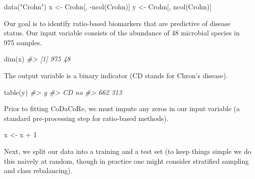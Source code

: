 \documentclass[
]{article}
\newenvironment{Shaded}{\begin{snugshade}}{\end{snugshade}}
\newcommand{\CommentTok}[1]{\textcolor[rgb]{0.56,0.35,0.01}{\textit{#1}}}
\newcommand{\DecValTok}[1]{\textcolor[rgb]{0.00,0.00,0.81}{#1}}
\newcommand{\FunctionTok}[1]{\textcolor[rgb]{0.00,0.00,0.00}{#1}}
\newcommand{\NormalTok}[1]{#1}
\newcommand{\OtherTok}[1]{\textcolor[rgb]{0.56,0.35,0.01}{#1}}
\newcommand{\SpecialCharTok}[1]{\textcolor[rgb]{0.00,0.00,0.00}{#1}}
\newcommand{\StringTok}[1]{\textcolor[rgb]{0.31,0.60,0.02}{#1}}
\begin{document}
\begin{Shaded}
\begin{Highlighting}[]
\FunctionTok{data}\NormalTok{(}\StringTok{"Crohn"}\NormalTok{)}
\NormalTok{x }\OtherTok{\textless{}{-}}\NormalTok{ Crohn[, }\SpecialCharTok{{-}}\FunctionTok{ncol}\NormalTok{(Crohn)]}
\NormalTok{y }\OtherTok{\textless{}{-}}\NormalTok{ Crohn[, }\FunctionTok{ncol}\NormalTok{(Crohn)]}
\end{Highlighting}
\end{Shaded}

Our goal is to identify ratio-based biomarkers that are predictive of
disease status. Our input variable consists of the abundance of 48
microbial species in 975 samples.

\begin{Shaded}
\begin{Highlighting}[]
\FunctionTok{dim}\NormalTok{(x)}
\CommentTok{\#\textgreater{} [1] 975  48}
\end{Highlighting}
\end{Shaded}

The output variable is a binary indicator (CD stands for Chron's
disease).

\begin{Shaded}
\begin{Highlighting}[]
\FunctionTok{table}\NormalTok{(y)}
\CommentTok{\#\textgreater{} y}
\CommentTok{\#\textgreater{}  CD  no }
\CommentTok{\#\textgreater{} 662 313}
\end{Highlighting}
\end{Shaded}

Prior to fitting CoDaCoRe, we must impute any zeros in our input
variable (a standard pre-processing step for ratio-based methods).

\begin{Shaded}
\begin{Highlighting}[]
\NormalTok{x }\OtherTok{\textless{}{-}}\NormalTok{ x }\SpecialCharTok{+} \DecValTok{1}
\end{Highlighting}
\end{Shaded}

Next, we split our data into a training and a test set (to keep things
simple we do this naively at random, though in practice one might
consider stratified sampling and class rebalancing).
\end{document}
